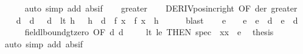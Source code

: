 \begin{isabellebody}
\ \ \ \ \isamarkupfalse%
\ {\isacharparenleft}{\kern0pt}auto\ simp\ add{\isacharcolon}{\kern0pt}\ abs{\isacharunderscore}{\kern0pt}if{\isacharparenright}{\kern0pt}\isanewline
{}\isamarkupfalse%
\isanewline
\ \ \isamarkupfalse%
\ greater\isanewline
\ \ \isamarkupfalse%
\ DERIV{\isacharunderscore}{\kern0pt}pos{\isacharunderscore}{\kern0pt}inc{\isacharunderscore}{\kern0pt}right\ {\isacharbrackleft}{\kern0pt}OF\ der\ greater{\isacharbrackright}{\kern0pt}\isanewline
\ \ \isamarkupfalse%
\ d{\isacharprime}{\kern0pt}\ \ d{\isacharprime}{\kern0pt}{\isacharcolon}{\kern0pt}\ {\isachardoublequoteopen}{}\ {\isacharless}{\kern0pt}\ d{\isacharprime}{\kern0pt}{\isachardoublequoteclose}\ \ lt{\isacharcolon}{\kern0pt}\ {\isachardoublequoteopen}{\isasymforall}h\ {\isachargreater}{\kern0pt}\ {}{\isachardot}{\kern0pt}\ h\ {\isacharless}{\kern0pt}\ d{\isacharprime}{\kern0pt}\ {\isasymlongrightarrow}\ f\ x\ {\isacharless}{\kern0pt}\ f\ {\isacharparenleft}{\kern0pt}x\ {\isacharplus}{\kern0pt}\ h{\isacharparenright}{\kern0pt}{\isachardoublequoteclose}\isanewline
\ \ \ \ \isamarkupfalse%
\ blast\isanewline
\ \ \isamarkupfalse%
\ e\ \ {\isachardoublequoteopen}{}\ {\isacharless}{\kern0pt}\ e\ {\isasymand}\ e\ {\isacharless}{\kern0pt}\ d\ {\isasymand}\ e\ {\isacharless}{\kern0pt}\ d{\isacharprime}{\kern0pt}{\isachardoublequoteclose}\isanewline
\ \ \ \ \isamarkupfalse%
\ field{\isacharunderscore}{\kern0pt}lbound{\isacharunderscore}{\kern0pt}gt{\isacharunderscore}{\kern0pt}zero\ {\isacharbrackleft}{\kern0pt}OF\ d\ d{\isacharprime}{\kern0pt}{\isacharbrackright}{\kern0pt}\ \isacommand{{\isachardot}{\kern0pt}{\isachardot}{\kern0pt}}\isamarkupfalse%
\isanewline
\ \ \isamarkupfalse%
\ lt\ le\ {\isacharbrackleft}{\kern0pt}THEN\ spec\ {\isacharbrackleft}{\kern0pt}\ x{\isacharequal}{\kern0pt}{\isachardoublequoteopen}x\ {\isacharplus}{\kern0pt}\ e{\isachardoublequoteclose}{\isacharbrackright}{\kern0pt}{\isacharbrackright}{\kern0pt}\ \isamarkupfalse%
\ {\isacharquery}{\kern0pt}thesis\isanewline
\ \ \ \ \isamarkupfalse%
\ {\isacharparenleft}{\kern0pt}auto\ simp\ add{\isacharcolon}{\kern0pt}\ abs{\isacharunderscore}{\kern0pt}if{\isacharparenright}{\kern0pt}\isanewline
{}\isamarkupfalse%
%
\endisatagproof
{\isafoldproof}%
%
\isadelimproof
%
\endisadelimproof
%
\begin{isamarkuptext}%

\end{isamarkuptext}
\end{isabellebody}
